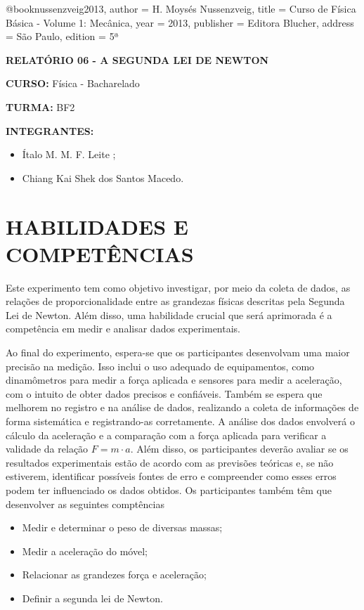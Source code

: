 \documentclass[article,11pt,oneside,a4paper,brazil]{abntex2}
\begin{document}
	@book{nussenzveig2013,
		author    = {H. Moysés Nussenzveig},
		title     = {Curso de Física Básica - Volume 1: Mecânica},
		year      = {2013},
		publisher = {Editora Blucher},
		address   = {São Paulo},
		edition   = {5ª}
	}
	
	\textbf{RELATÓRIO 06 - A SEGUNDA LEI DE NEWTON}
	
	\textbf{CURSO:} Física - Bacharelado
	
	\textbf{TURMA:} BF2
	
	\textbf{INTEGRANTES:}
	\begin{adjustwidth}{1cm}{0cm}
		\begin{itemize}
			\item Ítalo M. M. F. Leite ;
			\item Chiang Kai Shek dos Santos Macedo.
		\end{itemize}
	\end{adjustwidth}

	\section{HABILIDADES E COMPETÊNCIAS}
	
	Este experimento tem como objetivo investigar, por meio da coleta de dados, as relações de proporcionalidade entre as grandezas físicas descritas pela Segunda Lei de Newton. Além disso, uma habilidade crucial que será aprimorada é a competência em medir e analisar dados experimentais.
	
	Ao final do experimento, espera-se que os participantes desenvolvam uma maior 	precisão na medição. Isso inclui o uso adequado de equipamentos, como dinamômetros para medir a força aplicada e sensores para medir a aceleração, com o intuito de obter dados precisos e confiáveis. Também se espera que melhorem no registro e na análise de dados, realizando a coleta de informações de forma sistemática e registrando-as corretamente. A análise dos dados envolverá o cálculo da aceleração e a comparação com a força aplicada para verificar a validade da relação $F=m \cdot a$. Além disso, os participantes deverão avaliar se os resultados experimentais estão de acordo com as previsões teóricas e, se não estiverem, identificar possíveis fontes de erro e compreender como esses erros podem ter influenciado os dados obtidos. Os participantes também têm que desenvolver as seguintes comptências
	
	\begin{adjustwidth}{1cm}{0cm}
		\begin{itemize}
			\item Medir e determinar o peso de diversas massas;
			\item Medir a aceleração do móvel;
			\item Relacionar as grandezes força e aceleração;
			\item Definir a segunda lei de Newton.
		\end{itemize}
	\end{adjustwidth}
	
\end{document}
